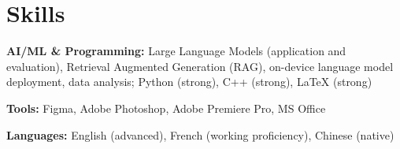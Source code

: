 \section{Skills}

        \begin{onecolentry}
            \textbf{AI/ML \& Programming:} Large Language Models (application and evaluation), Retrieval Augmented Generation (RAG), on-device language model deployment, data analysis; Python (strong), C++ (strong), LaTeX (strong)
        \end{onecolentry}
        \vspace{0.1 cm}

        \begin{onecolentry}
            \textbf{Tools:} Figma, Adobe Photoshop, Adobe Premiere Pro, MS Office
        \end{onecolentry}
        \vspace{0.1 cm}

        \begin{onecolentry}
            \textbf{Languages:} English (advanced), French (working proficiency), Chinese (native)
        \end{onecolentry}
